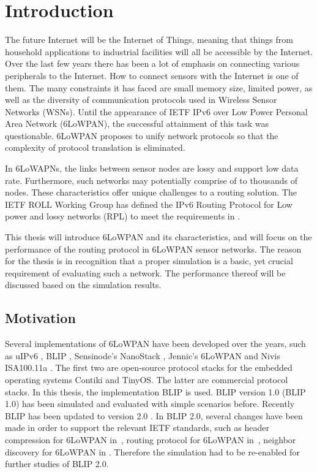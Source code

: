 \chapter{Introduction}
\label{1.0 Intr}

The future Internet will be the Internet of Things, meaning that things from household
applications to industrial facilities will all be accessible by the Internet. Over the last few years there has been a lot of emphasis on connecting various peripherals to the Internet. How to connect sensors with the Internet is one of them. The many constraints it has faced are small memory size, limited power,  as well as the diversity of communication protocols used in Wireless Sensor Networks (WSNs)\@. Until the appearance of IETF IPv6 over Low Power Personal Area Network (6LoWPAN)\@, the successful attainment of this task was questionable. 6LoWPAN proposes to unify network protocols so that the complexity of protocol translation is eliminated. 

In 6LoWAPNs, the links between sensor nodes are lossy and support low data rate. Furthermore, such networks may potentially comprise of to thousands of nodes. These characteristics offer unique challenges to a routing solution. The IETF ROLL Working Group has defined the IPv6 Routing Protocol for Low power and lossy networks (RPL) to meet the requirements in \cite{draft-ietf-roll-rpl-19}.

This thesis will introduce 6LoWPAN and its characteristics, and will focus on the performance of the routing protocol in 6LoWPAN sensor networks. The reason for the thesis is in recognition that a proper simulation is a basic, yet crucial requirement of evaluating such a network. The performance thereof will be discussed based on the simulation results.

\section{Motivation}
\label{Intr:Motiv}

Several implementations of 6LoWPAN have been developed over the years, such as uIPv6 \cite{uIPv6}, BLIP \cite{BLIP}, Sensinode's NanoStack \cite{Sensinode}, Jennic's 6LoWPAN \cite{Jennic} and Nivis ISA100.11a \cite{Nivis}. The first two are open-source protocol stacks for the embedded operating systems Contiki and TinyOS. The latter are commercial protocol stacks. In this thesis, the implementation BLIP is used. BLIP version 1.0 (BLIP 1.0) has been simulated and evaluated with simple scenarios before. Recently BLIP has been updated to version 2.0 \cite{BLIP2.0}\@. In BLIP 2.0, several changes have been made in order to support the relevant IETF standards, such as header compression for 6LoWPAN in~\cite{draft-ietf-6lowpan-hc-15}, routing protocol for 6LoWPAN in~\cite{draft-ietf-roll-rpl-19}, neighbor discovery for 6LoWPAN in \cite{draft-ietf-6lowpan-nd-15}. 
Therefore the simulation had to be re-enabled for further studies of BLIP 2.0. 


